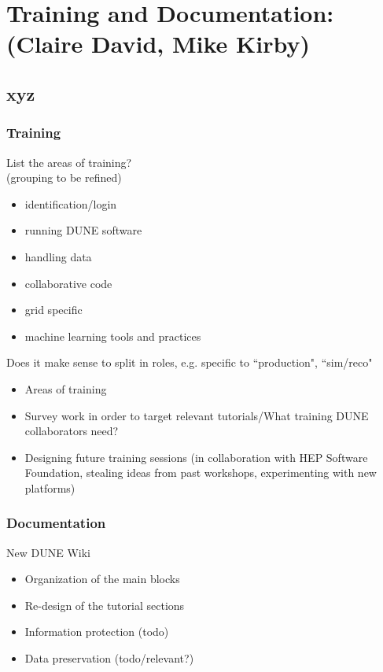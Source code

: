 \chapter{Training and Documentation: (Claire David, Mike Kirby)}
\label{ch:train}

\section{xyz}
\label{sec:train:xyz}  %

\subsection{Training}

List the areas of training?\\
(grouping to be refined)
\begin{itemize}
    \item identification/login 
    \item running DUNE software
    \item handling data
    \item collaborative code
    \item grid specific
    \item machine learning tools and practices
\end{itemize}
Does it make sense to split in roles, e.g. specific to ``production", ``sim/reco" 

\begin{itemize}
    \item Areas of training 
    \item Survey work in order to target relevant tutorials/What training DUNE collaborators need?
    \item Designing future training sessions (in collaboration with HEP Software Foundation, stealing ideas from past workshops, experimenting with new platforms)
\end{itemize}

\subsection{Documentation}
New DUNE Wiki
\begin{itemize}
    \item Organization of the main blocks
    \item Re-design of the tutorial sections
    \item Information protection (todo)
    \item Data preservation (todo/relevant?)
\end{itemize}
